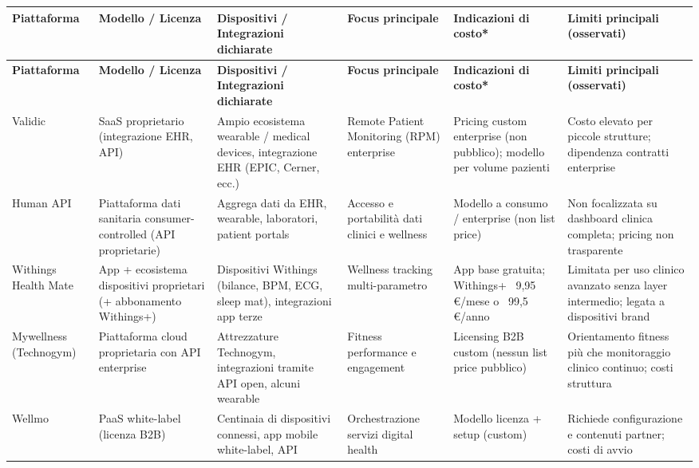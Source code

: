 \documentclass[12pt,a4paper,oneside]{report}
\begin{document}
\renewcommand{\arraystretch}{1.15}
\small
\begingroup
\setlength{\tabcolsep}{2pt}
\begin{longtable}{|>{\raggedright\arraybackslash}p{2cm}|>{\raggedright\arraybackslash}p{1.8cm}|>{\raggedright\arraybackslash}p{3.8cm}|>{\raggedright\arraybackslash}p{2.5cm}|>{\raggedright\arraybackslash}p{1.8cm}|>{\raggedright\arraybackslash}p{2cm}|}
\hline
\rowcolor[HTML]{F2F2F2}
	\textbf{Piattaforma} & \textbf{Modello / Licenza} & \textbf{Dispositivi / Integrazioni dichiarate} & \textbf{Focus principale} & \textbf{Indicazioni di costo*} & \textbf{Limiti principali (osservati)} \\
\hline
\endfirsthead
\hline
\rowcolor[HTML]{F2F2F2}\textbf{Piattaforma} & \textbf{Modello / Licenza} & \textbf{Dispositivi / Integrazioni dichiarate} & \textbf{Focus principale} & \textbf{Indicazioni di costo*} & \textbf{Limiti principali (osservati)} \\
\hline
\endhead
Validic & SaaS proprietario (integrazione EHR, API) & Ampio ecosistema wearable / medical devices, integrazione EHR (EPIC, Cerner, ecc.) & Remote Patient Monitoring (RPM) enterprise & Pricing custom enterprise (non pubblico); modello per volume pazienti & Costo elevato per piccole strutture; dipendenza contratti enterprise \\
\hline
Human API & Piattaforma dati sanitaria consumer-controlled (API proprietarie) & Aggrega dati da EHR, wearable, laboratori, patient portals & Accesso e portabilità dati clinici e wellness & Modello a consumo / enterprise (non list price) & Non focalizzata su dashboard clinica completa; pricing non trasparente \\
\hline
Withings Health Mate & App + ecosistema dispositivi proprietari (+ abbonamento Withings+) & Dispositivi Withings (bilance, BPM, ECG, sleep mat), integrazioni app terze & Wellness tracking multi-parametro & App base gratuita; Withings+ ~9,95 €/mese o ~99,5 €/anno & Limitata per uso clinico avanzato senza layer intermedio; legata a dispositivi brand \\
\hline
Mywellness (Technogym) & Piattaforma cloud proprietaria con API enterprise & Attrezzature Technogym, integrazioni tramite API open, alcuni wearable & Fitness performance e engagement & Licensing B2B custom (nessun list price pubblico) & Orientamento fitness più che monitoraggio clinico continuo; costi struttura \\
\hline
Wellmo & PaaS white-label (licenza B2B) & Centinaia di dispositivi connessi, app mobile white-label, API & Orchestrazione servizi digital health & Modello licenza + setup (custom) & Richiede configurazione e contenuti partner; costi di avvio \\

\end{longtable}
\end{document}
